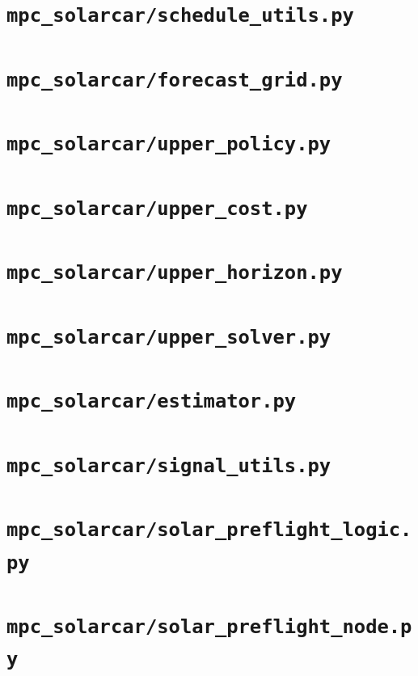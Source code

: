 \documentclass[a4paper,10pt,oneside]{book}
\begin{document}
\section{\texttt{mpc\_solarcar/schedule\_utils.py}}

\section{\texttt{mpc\_solarcar/forecast\_grid.py}}

\section{\texttt{mpc\_solarcar/upper\_policy.py}}

\section{\texttt{mpc\_solarcar/upper\_cost.py}}

\section{\texttt{mpc\_solarcar/upper\_horizon.py}}

\section{\texttt{mpc\_solarcar/upper\_solver.py}}

\section{\texttt{mpc\_solarcar/estimator.py}}

\section{\texttt{mpc\_solarcar/signal\_utils.py}}

\section{\texttt{mpc\_solarcar/solar\_preflight\_logic.py}}

\section{\texttt{mpc\_solarcar/solar\_preflight\_node.py}}

\end{document}
